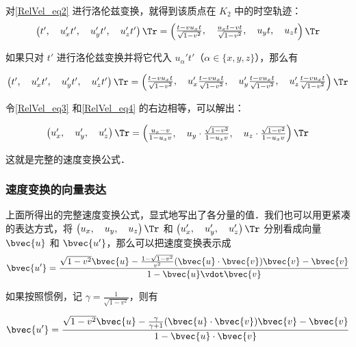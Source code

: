 对\autoref{RelVel_eq2} 进行洛伦兹变换，就得到该质点在 $K_2$ 中的时空轨迹：
\begin{equation}\label{RelVel_eq3}
\left(\begin{matrix}t',\quad u_x't',\quad u_y't',\quad u_z't'\end{matrix} \right)\Tr 
= 
\left(\begin{matrix}\frac{t-vu_xt}{\sqrt{1-v^2}},\quad\frac{u_xt-vt}{\sqrt{1-v^2}},\quad u_yt,\quad u_zt\end{matrix} \right)\Tr 
\end{equation}

如果只对 $t'$ 进行洛伦兹变换并将它代入 $u_\alpha't'$（$\alpha\in\{x, y, z\}$），那么有

\begin{equation}\label{RelVel_eq4}
\left(\begin{matrix}t',\quad u_x't',\quad u_y't',\quad u_z't'\end{matrix} \right)\Tr 
= 
\left(\begin{matrix}\frac{t-vu_xt}{\sqrt{1-v^2}},\quad u_x'\frac{t-vu_xt}{\sqrt{1-v^2}},\quad u_y'\frac{t-vu_xt}{\sqrt{1-v^2}},\quad u_z'\frac{t-vu_xt}{\sqrt{1-v^2}}\end{matrix} \right)\Tr 
\end{equation}

令\autoref{RelVel_eq3} 和\autoref{RelVel_eq4} 的右边相等，可以解出：

\begin{equation}
\left(\begin{matrix}u_x',\quad u_y',\quad u_z'\end{matrix} \right)\Tr 
= 
\left(\begin{matrix}\frac{u_x-v}{1-u_xv},\quad u_y\cdot\frac{\sqrt{1-v^2}}{1-u_xv},\quad u_z\cdot\frac{\sqrt{1-v^2}}{1-u_xv}\end{matrix} \right)\Tr 
\end{equation}

这就是完整的速度变换公式．

\subsubsection{速度变换的向量表达}

上面所得出的完整速度变换公式，显式地写出了各分量的值．我们也可以用更紧凑的表达方式，将 $\left(\begin{matrix}u_x,\quad u_y,\quad u_z\end{matrix} \right)\Tr $ 和 $\left(\begin{matrix}u_x',\quad u_y',\quad u_z'\end{matrix} \right)\Tr$ 分别看成向量 $\bvec{u}$ 和 $\bvec{u'}$，那么可以把速度变换表示成
\begin{equation}\label{RelVel_eq5}
\bvec{u'}=\frac{\sqrt{1-v^2}\bvec{u}-\frac{1-\sqrt{1-v^2}}{v^2}(\bvec{u}\cdot\bvec{v})\bvec{v}-\bvec{v}}{1-\bvec{u}\vdot\bvec{v}}
\end{equation}

如果按照惯例，记 $\gamma=\frac{1}{\sqrt{1-v^2}}$，则有

\begin{equation}
\bvec{u'}=\frac{\sqrt{1-v^2}\bvec{u}-\frac{\gamma}{\gamma+1}(\bvec{u}\cdot\bvec{v})\bvec{v}-\bvec{v}}{1-\bvec{u}\cdot\bvec{v}}
\end{equation}




